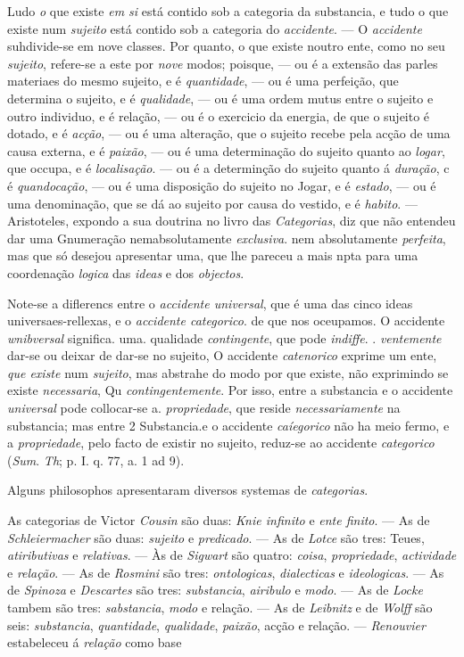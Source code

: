 Ludo \emph{o} que existe \emph{em si} está contido sob a categoria da substancia, e tudo o que existe num \emph{sujeito} está contido sob a categoria do \emph{accidente}. --- O \emph{accidente} suhdivide-se em nove classes. Por quanto, o que existe noutro ente, como no seu \emph{sujeito}, refere-se a este por \emph{nove} modos; poisque, --- ou é a extensão das parles materiaes do mesmo sujeito, e é \emph{quantidade}, --- ou é uma perfeição, que determina o sujeito, e é \emph{qualidade}, --- ou é uma ordem mutus entre o sujeito e outro individuo, e é relação, --- ou é o exercicio da energia, de que o sujeito é dotado, e é \emph{acção}, --- ou é uma alteração, que o sujeito recebe pela acção de uma causa externa, e é \emph{paixão}, --- ou é uma determinação do sujeito quanto ao \emph{logar}, que occupa, e é \emph{localisação}. --- ou é a determinção do sujeito quanto á \emph{duração}, c é \emph{quandocação}, --- ou é uma disposição do sujeito no Jogar, e é \emph{estado}, --- ou é uma denominação, que se dá ao sujeito por causa do vestido, e é \emph{habito}. --- Aristoteles, expondo a sua doutrina no livro das \emph{Categorias}, diz que não entendeu dar uma Gnumeração nemabsolutamente \emph{exclusiva}. nem absolutamente \emph{perfeita}, mas que só desejou apresentar uma, que lhe pareceu a mais npta para uma coordenação \emph{logica} das \emph{ideas} e dos \emph{objectos}.\par Note-se a diflerencs entre o \emph{accidente universal}, que é uma das cinco ideas universaes-rellexas, e o \emph{accidente categorico}. de que nos oceupamos. O accidente \emph{wnibversal} significa. uma. qualidade \emph{contingente}, que pode \emph{indiffe}. . \emph{ventemente} dar-se ou deixar de dar-se no sujeito, O accidente \emph{catenorico} exprime um ente, \emph{que existe} num \emph{sujeito}, mas abstrahe do modo por que existe, não exprimindo se existe \emph{necessaria}, Qu \emph{contingentemente}. Por isso, entre a substancia e o accidente \emph{universal} pode collocar-se a. \emph{propriedade}, que reside \emph{necessariamente} na substancia; mas entre 2 Substancia.e o accidente \emph{caíegorico} não ha meio fermo, e a \emph{propriedade}, pelo facto de existir no sujeito, reduz-se ao accidente \emph{categorico} (\emph{Sum}. \emph{Th}; p. I. q. 77, a. 1 ad 9).\par Alguns philosophos apresentaram diversos systemas de \emph{categorias}.\par As categorias de Victor \emph{Cousin} são duas: \emph{Knie infinito} e \emph{ente finito}. --- As de \emph{Schleiermacher} são duas: \emph{sujeito} e \emph{predicado}. --- As de \emph{Lotce} são tres: Teues, \emph{atiributivas} e \emph{relativas}. --- Às de \emph{Sigwart} são quatro: \emph{coisa}, \emph{propriedade}, \emph{actividade} e \emph{relação}. --- As de \emph{Rosmini} são tres: \emph{ontologicas}, \emph{dialecticas} e \emph{ideologicas}. --- As de \emph{Spinoza} e \emph{Descartes} são tres: \emph{substancia}, \emph{airibulo} e \emph{modo}. --- As de \emph{Locke} tambem são tres: \emph{sabstancia}, \emph{modo} e relação. --- As de \emph{Leibnitz} e de \emph{Wolff} são seis: \emph{substancia}, \emph{quantidade}, \emph{qualidade}, \emph{paixão}, acção e relação. --- \emph{Renouvier} estabeleceu á \emph{relação} como base 